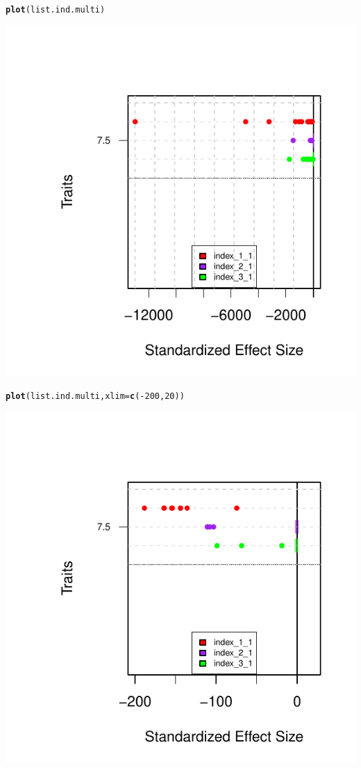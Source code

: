 \documentclass[12pt]{article}\usepackage[]{graphicx}\usepackage[]{color}
\makeatletter
\def\maxwidth{ %
  \ifdim\Gin@nat@width>\linewidth
    \linewidth
  \else
    \Gin@nat@width
  \fi
}
\newcommand{\hlnum}[1]{\textcolor[rgb]{0.686,0.059,0.569}{#1}}%
\newcommand{\hlopt}[1]{\textcolor[rgb]{0,0,0}{#1}}%
\newcommand{\hlstd}[1]{\textcolor[rgb]{0.345,0.345,0.345}{#1}}%
\newcommand{\hlkwc}[1]{\textcolor[rgb]{0.333,0.667,0.333}{#1}}%
\newcommand{\hlkwd}[1]{\textcolor[rgb]{0.737,0.353,0.396}{\textbf{#1}}}%
\newenvironment{kframe}{%
 \def\at@end@of@kframe{}%
 \ifinner\ifhmode%
  \def\at@end@of@kframe{\end{minipage}}%
  \begin{minipage}{\columnwidth}%
 \fi\fi%
 \def\FrameCommand##1{\hskip\@totalleftmargin \hskip-\fboxsep
 \colorbox{shadecolor}{##1}\hskip-\fboxsep
     \hskip-\linewidth \hskip-\@totalleftmargin \hskip\columnwidth}%
 \MakeFramed {\advance\hsize-\width
   \@totalleftmargin\z@ \linewidth\hsize
   \@setminipage}}%
 {\par\unskip\endMakeFramed%
 \at@end@of@kframe}
\newenvironment{knitrout}{}{} %
\makeatother
\begin{document}
\begin{knitrout}
\color{fgcolor}\begin{kframe}
\begin{alltt}
\hlkwd{plot}\hlstd{(list.ind.multi)}
\end{alltt}
\end{kframe}
\includegraphics[width=\maxwidth]{figure/unnamed-chunk-401} 
\begin{kframe}\begin{alltt}
\hlkwd{plot}\hlstd{(list.ind.multi,} \hlkwc{xlim} \hlstd{=} \hlkwd{c}\hlstd{(}\hlopt{-}\hlnum{200}\hlstd{,} \hlnum{20}\hlstd{))}
\end{alltt}
\end{kframe}
\includegraphics[width=\maxwidth]{figure/unnamed-chunk-402} 


\end{knitrout}
\end{document}
